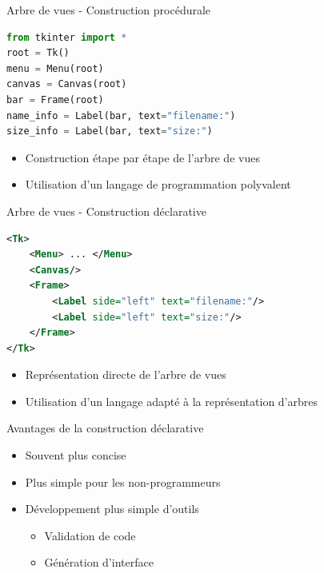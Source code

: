 \documentclass[xcolor=table]{beamer}
\begin{document}
\begin{frame}[fragile]{Arbre de vues - Construction procédurale}
\begin{lstlisting}[language=Python]
from tkinter import *
root = Tk()
menu = Menu(root)
canvas = Canvas(root)
bar = Frame(root)
name_info = Label(bar, text="filename:")
size_info = Label(bar, text="size:")
\end{lstlisting}

\begin{itemize}
    \item Construction étape par étape de l'arbre de vues
    \item Utilisation d'un langage de programmation polyvalent
\end{itemize}
\end{frame}

\begin{frame}[fragile]{Arbre de vues - Construction déclarative}
\begin{lstlisting}[language=XML]
<Tk>
    <Menu> ... </Menu>
    <Canvas/>
    <Frame>
        <Label side="left" text="filename:"/>
        <Label side="left" text="size:"/>
    </Frame>
</Tk>
\end{lstlisting}
\begin{itemize}
    \item Représentation directe de l'arbre de vues
    \item Utilisation d'un langage adapté à la représentation d'arbres
\end{itemize}
\end{frame}

\begin{frame}{Avantages de la construction déclarative}
\begin{itemize}
    \item Souvent plus concise
    \item Plus simple pour les non-programmeurs
    \item Développement plus simple d'outils
    \begin{itemize}
        \item Validation de code
        \item Génération d'interface
    \end{itemize}
\end{itemize}
\end{frame}

\end{document}

